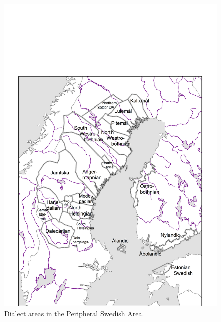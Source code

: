 \begin{figure}[h]

\includegraphics[height=.3\textheight]{figures/6_DialectAreas}
\caption{Dialect areas in the Peripheral Swedish Area.}
\label{map:5}

\end{figure}
 

